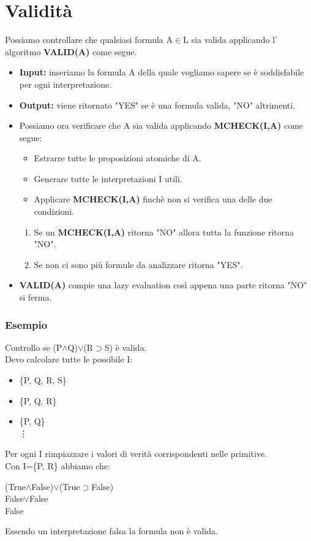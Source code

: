 \documentclass[../main.tex]{subfiles}
\begin{document}
    \section{Validità}
    Possiamo controllare che qualsiasi formula A$\in$L sia valida applicando l' algoritmo \textbf{VALID(A)} come segue.
    \begin{itemize}
        \item \textbf{Input:} inseriamo la formula A della quale vogliamo sapere se è soddisfabile per ogni interpretazione.
        \item \textbf{Output:} viene ritornato "YES" se è una formula valida, "NO" altrimenti.
        \item Possiamo ora verificare che A sia valida applicando \textbf{MCHECK(I,A)} come segue:
        \begin{itemize}
            \item Estrarre tutte le proposizioni atomiche di A.
            \item Generare tutte le interpretazioni I utili.
            \item Applicare \textbf{MCHECK(I,A)} finchè non si verifica una delle due condizioni.
        \end{itemize}
        \begin{enumerate}
            \item Se un \textbf{MCHECK(I,A)} ritorna "NO" allora tutta la funzione ritorna "NO".
            \item Se non ci sono più formule da analizzare ritorna "YES".
        \end{enumerate}
        \item \textbf{VALID(A)} compie  una lazy evaluation così appena una parte ritorna "NO" si ferma.
    \end{itemize}

    \subsubsection{Esempio}
    Controllo se (P$\land$Q)$\lor$(R$\supset$S) è valida.\\
    Devo calcolare tutte le possibile I:
    \begin{itemize}
        \item \{P, Q, R, S\}
        \item \{P, Q, R\}
        \item \{P, Q\}\\
        \vdots
    \end{itemize}
    Per ogni I rimpiazzare i valori di verità corrispondenti nelle primitive.\\
    Con I=\{P, R\} abbiamo che:
    \begin{center}
        (True$\land$False)$\lor$(True$\supset$False)\\
        False$\lor$False\\
        False
    \end{center}
    Essendo un interpretazione falsa la formula non è valida.
\end{document}

